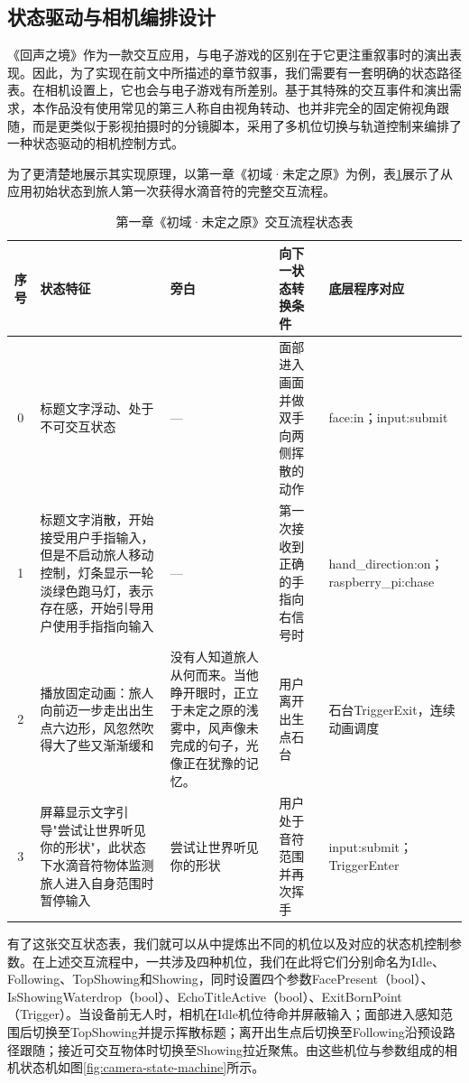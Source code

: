 \documentclass[bachelor]{njupthesis}
\begin{document}
\subsection{状态驱动与相机编排设计}

《回声之境》作为一款交互应用，与电子游戏的区别在于它更注重叙事时的演出表现。因此，为了实现在前文中所描述的章节叙事，我们需要有一套明确的状态路径表。在相机设置上，它也会与电子游戏有所差别。基于其特殊的交互事件和演出需求，本作品没有使用常见的第三人称自由视角转动、也并非完全的固定俯视角跟随，而是更类似于影视拍摄时的分镜脚本，采用了多机位切换与轨道控制来编排了一种状态驱动的相机控制方式。

为了更清楚地展示其实现原理，以第一章《初域·未定之原》为例，表\ref{tbl:chapter1-flow}展示了从应用初始状态到旅人第一次获得水滴音符的完整交互流程。

\begin{table}[h!]
\centering
\caption{第一章《初域·未定之原》交互流程状态表}
\label{tbl:chapter1-flow}
\begin{tabularx}{\linewidth}{cXXXX}
\toprule
序号 & 状态特征 & 旁白 & 向下一状态转换条件 & 底层程序对应 \\
\midrule
0 & 标题文字浮动、处于不可交互状态 & — & 面部进入画面并做双手向两侧挥散的动作 & face:in；input:submit \\
1 & 标题文字消散，开始接受用户手指输入，但是不启动旅人移动控制，灯条显示一轮淡绿色跑马灯，表示存在感，开始引导用户使用手指指向输入 & — & 第一次接收到正确的手指向右信号时 & hand\_direction:on；raspberry\_pi:chase \\
2 & 播放固定动画：旅人向前迈一步走出出生点六边形，风忽然吹得大了些又渐渐缓和 & 没有人知道旅人从何而来。当他睁开眼时，正立于未定之原的浅雾中，风声像未完成的句子，光像正在犹豫的记忆。 & 用户离开出生点石台 & 石台TriggerExit，连续动画调度 \\
3 & 屏幕显示文字引导"尝试让世界听见你的形状"，此状态下水滴音符物体监测旅人进入自身范围时暂停输入 & 尝试让世界听见你的形状 & 用户处于音符范围并再次挥手 & input:submit；TriggerEnter \\
\bottomrule
\end{tabularx}
\end{table}


有了这张交互状态表，我们就可以从中提炼出不同的机位以及对应的状态机控制参数。在上述交互流程中，一共涉及四种机位，我们在此将它们分别命名为Idle、Following、TopShowing和Showing，同时设置四个参数FacePresent（bool）、IsShowingWaterdrop（bool）、EchoTitleActive（bool）、ExitBornPoint（Trigger）。当设备前无人时，相机在Idle机位待命并屏蔽输入；面部进入感知范围后切换至TopShowing并提示挥散标题；离开出生点后切换至Following沿预设路径跟随；接近可交互物体时切换至Showing拉近聚焦。由这些机位与参数组成的相机状态机如图\ref{fig:camera-state-machine}所示。
\end{document}
